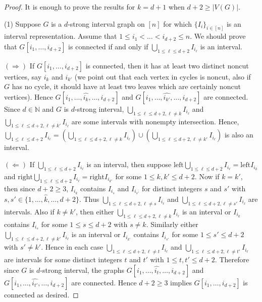 \documentclass[10pt,a4paper]{amsart}
\begin{document}
\begin{proof}
It is enough to prove the results for $k=d+1$ when $d+2\geq |V(G)|$.

(1) Suppose $G$ is a $d$-strong interval graph on $[n]$ for which $\{I_i\}_{i\in [n]}$ is an interval representation. Assume that $1\leq i_1< \dots < i_{d+2}\leq n$. We should prove that $G[i_1, \dots , i_{d+2}]$ is connected if and only if $\bigcup_{1\leq \ell \leq d+2}I_{i_\ell}$ is an interval.

$(\Longrightarrow )$ If $G[i_1, \dots , i_{d+2}]$ is connected, then it has at least two distinct noncut vertices, say $i_k$ and $i_{k'}$  (we point out that each vertex in cycles is noncut, also if $G$ has no cycle, it should have at least two leaves which are certainly noncut vertices). Hence $G[i_1, \dots ,\widehat{i_k}, \dots, i_{d+2}]$ and $G[i_1, \dots ,\widehat{i_{k'}}, \dots, i_{d+2}]$ are connected. Since $d\in \mathbb{N}$ and $G$ is $d$-strong interval,  $\bigcup_{1\leq \ell \leq d+2, \ell\neq k}I_{i_\ell}$ and $\bigcup_{1\leq \ell \leq d+2, \ell\neq k'}I_{i_\ell}$ are some intervals with nonempty intersection. Hence, $\bigcup_{1\leq \ell \leq d+2}I_{i_\ell}=(\bigcup_{1\leq \ell \leq d+2, \ell\neq k}I_{i_\ell}) \cup (\bigcup_{1\leq \ell \leq d+2, \ell\neq k'}I_{i_\ell})$ is also an interval.

$(\Longleftarrow )$ If $\bigcup_{1\leq \ell \leq d+2}I_{i_\ell}$ is an interval, then suppose $\mathrm{left} \bigcup_{1\leq \ell \leq d+2}I_{i_\ell}=\mathrm{left}I_{i_k}$ and  $\mathrm{right} \bigcup_{1\leq \ell \leq d+2}I_{i_\ell}=\mathrm{right}I_{i_{k'}}$ for some $1\leq k,k'\leq d+2$. Now if $k=k'$, then since $d+2\geq 3$, $I_{i_k}$ contains $I_{i_s}$ and $I_{i_{s'}}$ for distinct integers $s$ and $s'$ with $s,s'\in \{1, \dots, \widehat{k}, \dots , d+2\}$. Thus $\bigcup_{1\leq \ell \leq d+2, \ell\neq s}I_{i_\ell}$ and $\bigcup_{1\leq \ell \leq d+2, \ell\neq s'}I_{i_\ell}$ are intervals. Also if $k\neq k'$, then either $\bigcup_{1\leq \ell \leq d+2, \ell\neq k}I_{i_\ell}$ is an interval or $I_{i_k}$ contains $I_{i_s}$ for some $1\leq s \leq d+2$ with $s\neq k$. Similarly either $\bigcup_{1\leq \ell \leq d+2, \ell\neq k'}I_{i_\ell}$ is an interval or $I_{i_{k'}}$ contains $I_{i_{s'}}$ for some $1\leq s' \leq d+2$ with $s'\neq k'$. Hence in each case $\bigcup_{1\leq \ell \leq d+2, \ell\neq t}I_{i_\ell}$ and $\bigcup_{1\leq \ell \leq d+2, \ell\neq t'}I_{i_\ell}$ are intervals for some distinct integers $t$ and $t'$ with $1\leq t,t'\leq d+2$. Therefore since  $G$ is $d$-strong interval, the graphs $G[i_1, \dots , \widehat{i_t}, \dots , i_{d+2}]$ and $G[i_1, \dots , \widehat{i_{t'}}, \dots , i_{d+2}]$ are connected. Hence $d+2\geq 3$ implies $G[i_1, \dots, i_{d+2}]$  is connected as desired.


\end{proof}
\end{document}
